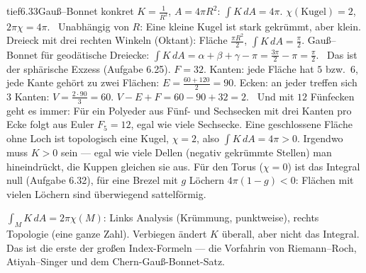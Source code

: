 \begin{loesungkarte}{tief}{6.33}{Gauß--Bonnet konkret}
$K = \frac1{R^{2}}$, $A = 4\pi R^{2}$: $\int K\,dA = 4\pi$. $\chi(\text{Kugel}) = 2$, $2\pi\chi = 4\pi$. \checkmark\ Unabhängig von $R$: Eine kleine Kugel ist stark gekrümmt, aber klein.
Dreieck mit drei rechten Winkeln (Oktant): Fläche $\frac{\pi R^{2}}2$, $\int K\,dA = \frac\pi2$. Gauß--Bonnet für geodätische Dreiecke: $\int K\,dA = \alpha + \beta + \gamma - \pi = \frac{3\pi}2 - \pi = \frac\pi2$. \checkmark\ Das ist der sphärische Exzess (Aufgabe 6.25).
$F = 32$. Kanten: jede Fläche hat $5$ bzw.\ $6$, jede Kante gehört zu zwei Flächen: $E = \frac{60 + 120}2 = 90$. Ecken: an jeder treffen sich $3$ Kanten: $V = \frac{2\cdot90}3 = 60$. $V - E + F = 60 - 90 + 32 = 2$. \checkmark\ Und mit $12$ Fünfecken geht es immer: Für ein Polyeder aus Fünf- und Sechsecken mit drei Kanten pro Ecke folgt aus Euler $F_5 = 12$, egal wie viele Sechsecke.
Eine geschlossene Fläche ohne Loch ist topologisch eine Kugel, $\chi = 2$, also $\int K\,dA = 4\pi > 0$. Irgendwo muss $K > 0$ sein --- egal wie viele Dellen (negativ gekrümmte Stellen) man hineindrückt, die Kuppen gleichen sie aus. Für den Torus ($\chi = 0$) ist das Integral null (Aufgabe 6.32), für eine Brezel mit $g$ Löchern $4\pi(1 - g) < 0$: Flächen mit vielen Löchern sind überwiegend sattelförmig.
\begin{mitnehmen}\kastentext
$\int_MK\,dA = 2\pi\chi(M)$: Links Analysis (Krümmung, punktweise), rechts Topologie (eine ganze Zahl). Verbiegen ändert $K$ überall, aber nicht das Integral. Das ist die erste der großen Index-Formeln --- die Vorfahrin von Riemann--Roch, Atiyah--Singer und dem Chern-Gauß-Bonnet-Satz.
\end{mitnehmen}
\end{loesungkarte}

